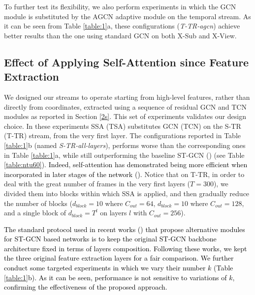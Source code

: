 \documentclass[times,twocolumn,final,authoryear]{elsarticle}
\DeclareRobustCommand{\new}[1]
{{\textcolor{black}{#1}}}
\begin{document}
To further test its flexibility, we also perform experiments in which the GCN module is substituted by the AGCN adaptive module on the temporal stream. As it can be seen from Table \ref{table:1}a, these configurations (\textit{T-TR-agcn}) achieve better results than the one using standard GCN on both X-Sub and X-View.










\setlength{\tabcolsep}{4pt}




\subsection{Effect of Applying Self-Attention since Feature Extraction}
We designed our streams to operate starting from high-level features, rather than directly from coordinates, extracted using a sequence of residual GCN and TCN modules as reported in Section \ref{2s}. This set of experiments validates our design choice. In these experiments SSA (TSA) substitutes GCN (TCN) on the S-TR (T-TR) stream, from the very first layer. The configurations reported in Table \ref{table:1}b (named \textit{S-TR-all-layers}), performs worse than the corresponding ones in Table \ref{table:1}a, while still outperforming the baseline ST-GCN (\cite{dirgraph}) (see Table \ref{table:ntu60}). \new{Indeed, self-attention has demonstrated being more efficient when 
incorporated in later stages of the network (\cite{carion2020end,huang2019ccnet,non-local}).} 
Notice that on T-TR, in order to deal with the great number of frames in the very first layers ($T=300$), we divided them into blocks within which SSA is applied, and then gradually reduce the number of blocks ($d_{block}=10$ where $C_{out}=64$, $d_{block}=10$ where $C_{out}=128$, and a single block of $d_{block}=T^l$ on layers $l$ with $C_{out}=256$).


\new{The standard protocol used in recent works (\cite{shift,Shi2018TwoStreamAG}) that propose alternative modules for ST-GCN based networks is to keep the original ST-GCN backbone architecture fixed in terms of layers composition. Following these works, we kept the three original feature extraction layers for a fair comparison. We further conduct some targeted experiments in which we vary their number $k$ (Table \ref{table:1}b). As it can be seen, performance is not sensitive to variations of $k$, confirming the effectiveness of the proposed approach.}
\end{document}
